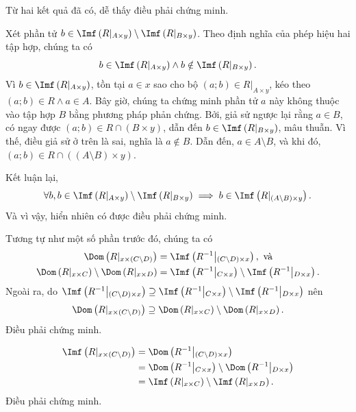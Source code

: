 Từ hai kết quả đã có, dễ thấy điều phải chứng minh.

\stepSubexercise Xét phần tử $b \in \Imf\left(R|_{A \times y}\right) \setminus \Imf\left(R|_{B \times y}\right)$. Theo định nghĩa của phép hiệu hai tập hợp, chúng ta có
\begin{equation*}
   b \in \Imf\left(R|_{A \times y}\right) \land b \notin \Imf\left(R|_{B \times y}\right).
\end{equation*}
Vì $b \in \Imf\left(R|_{A \times y}\right)$, tồn tại $a \in x$ sao cho bộ $(a; b) \in R|_{A \times y}$, kéo theo $(a; b) \in R \land a \in A$. Bây giờ, chúng ta chứng minh phần tử $a$ này không thuộc vào tập hợp $B$ bằng phương pháp phản chứng. Bởi, giả sử ngược lại rằng $a \in B$, có ngay được $(a; b) \in R \cap (B \times y)$, dẫn đến $b \in \Imf\left(R|_{B \times y}\right)$, mâu thuẫn. Vì thế, điều giả sử ở trên là sai, nghĩa là $a \notin B$. Dẫn đến, $a \in A \setminus B$, và khi đó, $(a; b) \in R \cap \left((A \setminus B) \times y\right)$.

Kết luận lại, $$\forall b, b \in \Imf\left(R|_{A \times y}\right) \setminus \Imf\left(R|_{B \times y}\right) \implies b \in \Imf\left(R|_{(A \setminus B) \times y}\right).$$
Và vì vậy, hiển nhiên có được điều phải chứng minh.

\stepSubexercise Tương tự như một số phần trước đó, chúng ta có 
\begin{align*}
   \Dom\left(R|_{x \times (C \setminus D)} \right) &= \Imf\left(R^{-1}\middle|_{(C \setminus D) \times x}\right),\text{~và}\\
   \Dom\left(R|_{x \times C} \right) \setminus \Dom\left(R|_{x \times D} \right) &= \Imf\left(R^{-1} \middle|_{C \times x}\right) \setminus \Imf\left(R^{-1} \middle|_{D \times x}\right).
\end{align*}
Ngoài ra, do $\Imf\left(R^{-1}\middle|_{(C \setminus D) \times x}\right) \supseteq \Imf\left(R^{-1} \middle|_{C \times x}\right) \setminus \Imf\left(R^{-1} \middle|_{D \times x}\right)$ nên \begin{equation*}
   \Dom\left(R|_{x \times (C \setminus D)} \right) \supseteq \Dom\left(R|_{x \times C} \right) \setminus \Dom\left(R|_{x \times D} \right).
\end{equation*}
Điều phải chứng minh.

\stepSubexercise 
\begin{align*}
   \Imf\left(R|_{x \times (C \setminus D)} \right) &= \Dom\left(R^{-1}\middle|_{(C \setminus D) \times x}\right) \\
   &= \Dom\left(R^{-1} \middle|_{C \times x}\right) \setminus \Dom\left(R^{-1} \middle|_{D \times x}\right) \\
   &= \Imf\left(R|_{x \times C} \right) \setminus \Imf\left(R|_{x \times D} \right).
\end{align*}
Điều phải chứng minh.

